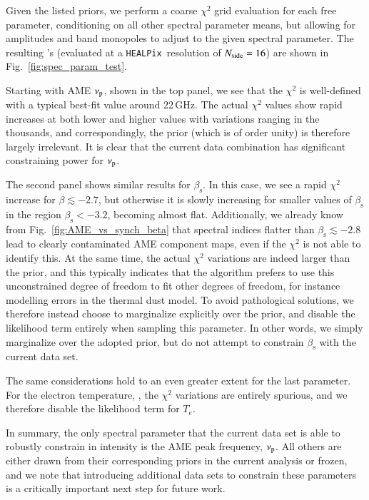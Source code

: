 \documentclass[twocolumn]{aa}
\def\healpix{\texttt{HEALPix}}
\begin{document}
Given the listed priors, we perform a coarse $\chi^2$ grid evaluation
for each free parameter, conditioning on all other spectral parameter
means, but allowing for amplitudes and band monopoles to adjust to the
given spectral parameter. The resulting \chisq's (evaluated at
a \healpix\ resolution of $\nside=16$) are shown in
Fig.~\ref{fig:spec_param_test}.


Starting with AME $\nup$, shown in the top panel, we see that the
$\chi^2$ is well-defined with a typical best-fit value around
22\,GHz. The actual $\chi^2$ values show
rapid increases at both lower and higher values with variations
ranging in the thousands, and correspondingly, the prior (which is of
order unity) is therefore largely irrelevant. It is clear that the
current data combination has significant constraining power for
$\nup$.

The second panel shows similar results for $\beta_{\mathrm{s}}$. In
this case, we see a rapid $\chi^2$ increase for $\beta\lesssim-2.7$,
but otherwise it is slowly increasing for smaller values of $\beta_{\mathrm{s}}$
in the region $\beta_{\mathrm{s}} < -3.2$, becoming almost flat.
Additionally, we already know from
Fig.~\ref{fig:AME_vs_synch_beta} that spectral indices flatter than
$\beta_{\mathrm{s}}\lesssim-2.8$ lead to clearly contaminated AME
component maps, even if the $\chi^2$ is not able to identify this. At
the same time, the actual $\chi^2$ variations are indeed larger than
the prior, and this typically indicates that the algorithm prefers to
use this unconstrained degree of freedom to fit other degrees of
freedom, for instance modelling errors in the thermal dust model. To
avoid pathological solutions, we therefore instead choose to
marginalize explicitly over the prior, and disable the likelihood term
entirely when sampling this parameter. In other words, we simply
marginalize over the adopted prior, but do not attempt to constrain
$\beta_{\mathrm{s}}$ with the current data set.

The same considerations hold to an even greater extent for the last parameter.
For the electron temperature, \Te, the $\chi^2$ variations are
entirely spurious, and we therefore disable the likelihood term for $T_e$. 

In summary, the only spectral parameter that the current data set is
able to robustly constrain in intensity is the AME peak frequency,
$\nup$. All others are either drawn from their corresponding priors in the
current analysis or frozen, and we note that introducing additional data sets to
constrain these parameters is a critically important next step for
future work. 
\end{document}
